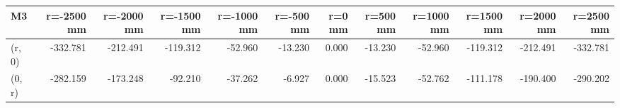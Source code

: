 \documentclass[convert={convertexe={magick.exe}}]{standalone}
\begin{document}
\begin{tabular}{lrrrrrrrrrrr}
\toprule
\bf{M3} &  r=-2500 mm &  r=-2000 mm &  r=-1500 mm &  r=-1000 mm &  r=-500 mm &  r=0 mm &  r=500 mm &  r=1000 mm &  r=1500 mm &  r=2000 mm &  r=2500 mm \\
\midrule
(r, 0) &    -332.781 &    -212.491 &    -119.312 &     -52.960 &    -13.230 &   0.000 &   -13.230 &    -52.960 &   -119.312 &   -212.491 &   -332.781 \\
(0, r) &    -282.159 &    -173.248 &     -92.210 &     -37.262 &     -6.927 &   0.000 &   -15.523 &    -52.762 &   -111.178 &   -190.400 &   -290.202 \\
\bottomrule
\end{tabular}
\end{document}
